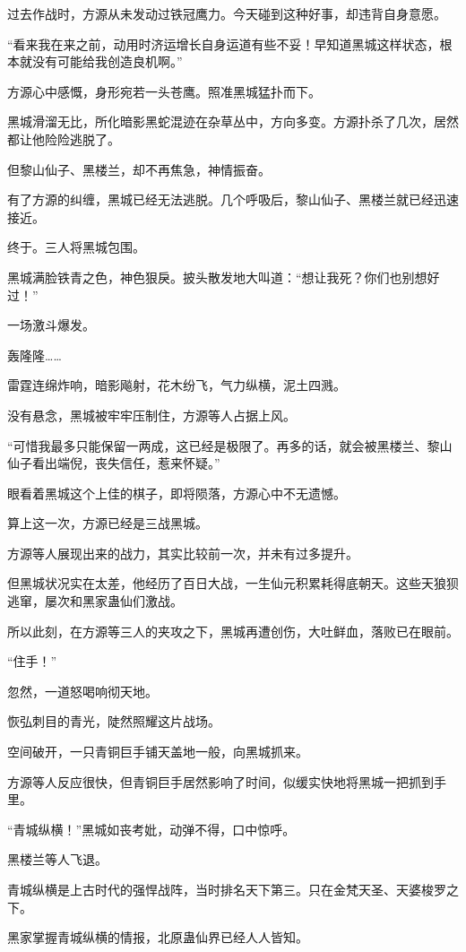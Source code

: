 \begin{this_body}
过去作战时，方源从未发动过铁冠鹰力。今天碰到这种好事，却违背自身意愿。

“看来我在来之前，动用时济运增长自身运道有些不妥！早知道黑城这样状态，根本就没有可能给我创造良机啊。”

方源心中感慨，身形宛若一头苍鹰。照准黑城猛扑而下。

黑城滑溜无比，所化暗影黑蛇混迹在杂草丛中，方向多变。方源扑杀了几次，居然都让他险险逃脱了。

但黎山仙子、黑楼兰，却不再焦急，神情振奋。

有了方源的纠缠，黑城已经无法逃脱。几个呼吸后，黎山仙子、黑楼兰就已经迅速接近。

终于。三人将黑城包围。

黑城满脸铁青之色，神色狠戾。披头散发地大叫道：“想让我死？你们也别想好过！”

一场激斗爆发。

轰隆隆……

雷霆连绵炸响，暗影飚射，花木纷飞，气力纵横，泥土四溅。

没有悬念，黑城被牢牢压制住，方源等人占据上风。

“可惜我最多只能保留一两成，这已经是极限了。再多的话，就会被黑楼兰、黎山仙子看出端倪，丧失信任，惹来怀疑。”

眼看着黑城这个上佳的棋子，即将陨落，方源心中不无遗憾。

算上这一次，方源已经是三战黑城。

方源等人展现出来的战力，其实比较前一次，并未有过多提升。

但黑城状况实在太差，他经历了百日大战，一生仙元积累耗得底朝天。这些天狼狈逃窜，屡次和黑家蛊仙们激战。

所以此刻，在方源等三人的夹攻之下，黑城再遭创伤，大吐鲜血，落败已在眼前。

“住手！”

忽然，一道怒喝响彻天地。

恢弘刺目的青光，陡然照耀这片战场。

空间破开，一只青铜巨手铺天盖地一般，向黑城抓来。

方源等人反应很快，但青铜巨手居然影响了时间，似缓实快地将黑城一把抓到手里。

“青城纵横！”黑城如丧考妣，动弹不得，口中惊呼。

黑楼兰等人飞退。

青城纵横是上古时代的强悍战阵，当时排名天下第三。只在金梵天圣、天婆梭罗之下。

黑家掌握青城纵横的情报，北原蛊仙界已经人人皆知。


\end{this_body}
